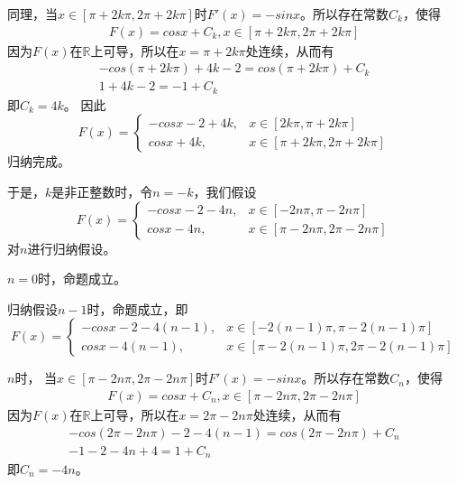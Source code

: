 \documentclass{article}
\begin{document}
\begin{itemize}
        同理，当$x \in [\pi + 2k \pi, 2\pi + 2k \pi]$时$F'(x) = -sin x$。所以存在常数$C_k$，使得
        \begin{align*}
          F(x) = cosx + C_k, x \in [\pi + 2k \pi, 2\pi + 2k \pi]
        \end{align*}
        因为$F(x)$在$\mathbb{R}$上可导，所以在$x = \pi + 2k \pi$处连续，从而有
        \begin{align*}
          -cos (\pi + 2k \pi) + 4k -2 = cos(\pi + 2k \pi) + C_k \\
          1 + 4k - 2 = -1 + C_k
        \end{align*}
        即$C_k = 4k$。
        因此
        \begin{equation*}
          F(x) =
          \begin{cases}
            -cosx - 2 + 4k, & x \in [2k \pi, \pi + 2k \pi]        \\
            cosx + 4k,      & x \in [\pi + 2k \pi, 2\pi + 2k \pi]
          \end{cases}
        \end{equation*}
        归纳完成。

        于是，$k$是非正整数时，令$n = -k$，我们假设
        \begin{equation*}
          F(x) =
          \begin{cases}
            -cosx - 2 - 4n, & x \in [-2n \pi, \pi - 2n \pi]       \\
            cosx - 4n,      & x \in [\pi - 2n \pi, 2\pi - 2n \pi]
          \end{cases}
        \end{equation*}
        对$n$进行归纳假设。

        $n = 0$时，命题成立。

        归纳假设$n-1$时，命题成立，即
        \begin{equation*}
          F(x) =
          \begin{cases}
            -cosx - 2 - 4(n-1), & x \in [-2(n-1) \pi, \pi - 2(n-1) \pi]       \\
            cosx - 4(n-1),      & x \in [\pi - 2(n-1) \pi, 2\pi - 2(n-1) \pi]
          \end{cases}
        \end{equation*}

        $n$时，
        当$x \in [\pi - 2n \pi, 2\pi - 2n \pi]$时$F'(x) = -sin x$。所以存在常数$C_n$，使得
        \begin{align*}
          F(x) = cos x + C_n, x \in [\pi - 2n \pi, 2\pi - 2n \pi]
        \end{align*}
        因为$F(x)$在$\mathbb{R}$上可导，所以在$x = 2\pi - 2n \pi$处连续，从而有
        \begin{align*}
          -cos(2\pi - 2n \pi) - 2 - 4(n-1) = cos (2\pi - 2n \pi) + C_n \\
          -1 - 2 - 4n + 4 = 1 + C_n
        \end{align*}
        即$C_n = - 4n$。


\end{itemize}
\end{document}
